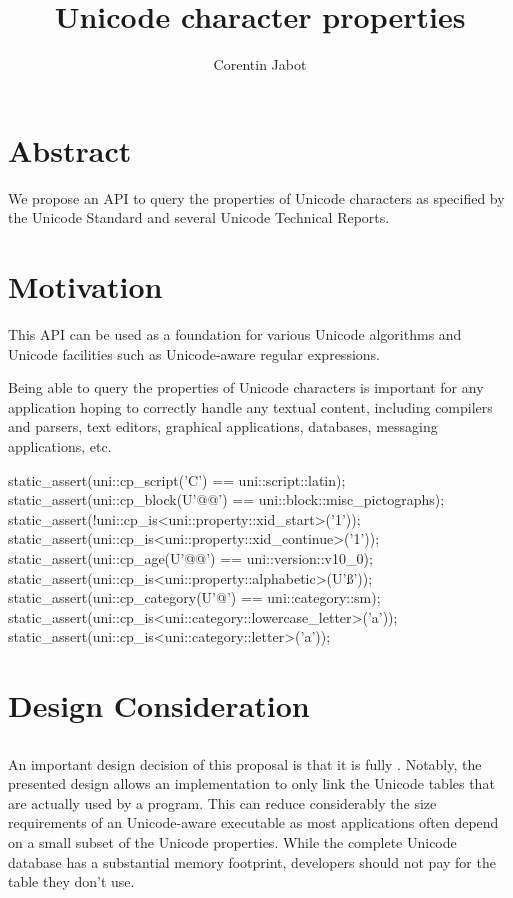 \documentclass{wg21}
\title{Unicode character properties}
\author{Corentin Jabot}{corentin.jabot@gmail.com}
\begin{document}
\maketitle

\section{Abstract}

We propose an API to query the properties of Unicode characters as specified by the Unicode Standard and
several Unicode Technical Reports.

\section{Motivation}

This API can be used as a foundation for various Unicode algorithms and Unicode facilities such as Unicode-aware
regular expressions.

Being able to query the properties of Unicode characters is important for any application hoping to correctly
handle any textual content, including compilers and parsers, text editors, graphical applications, databases,
messaging applications, etc.

\begin{codeblock}

static_assert(uni::cp_script('C') == uni::script::latin);
static_assert(uni::cp_block(U'@@') == uni::block::misc_pictographs);
static_assert(!uni::cp_is<uni::property::xid_start>('1'));
static_assert(uni::cp_is<uni::property::xid_continue>('1'));
static_assert(uni::cp_age(U'@@') == uni::version::v10_0);
static_assert(uni::cp_is<uni::property::alphabetic>(U'ß'));
static_assert(uni::cp_category(U'@\cap@') == uni::category::sm);
static_assert(uni::cp_is<uni::category::lowercase_letter>('a'));
static_assert(uni::cp_is<uni::category::letter>('a'));

\end{codeblock}

\section{Design Consideration}

\subsection{}

An important design decision of this proposal is that it is fully .
Notably, the presented design allows an implementation to only link the Unicode tables that are actually used by
a program. This can reduce considerably the size requirements of an Unicode-aware executable as most applications
often depend on a small subset of the Unicode properties.
While the complete Unicode database has a substantial memory footprint, developers should
not pay for the table they don't use.
\end{document}
